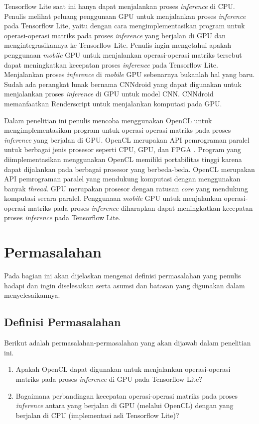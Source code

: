 Tensorflow Lite saat ini hanya dapat menjalankan proses \textit{inference} di CPU. Penulis melihat peluang penggunaan GPU untuk menjalankan proses \textit{inference} pada Tensorflow Lite, yaitu dengan cara mengimplementasikan program untuk operasi-operasi matriks pada proses \textit{inference} yang berjalan di GPU dan mengintegrasikannya ke Tensorflow Lite. Penulis ingin mengetahui apakah penggunaan \textit{mobile} GPU untuk menjalankan operasi-operasi matriks tersebut dapat meningkatkan kecepatan proses \textit{inference} pada Tensorflow Lite. Menjalankan proses \textit{inference} di \textit{mobile} GPU sebenarnya bukanlah hal yang baru. Sudah ada perangkat lunak bernama CNNdroid \cite{cnndroid} yang dapat digunakan untuk menjalankan proses \textit{inference} di GPU untuk model CNN. CNNdroid memanfaatkan Renderscript untuk menjalankan komputasi pada GPU.

Dalam penelitian ini penulis mencoba menggunakan OpenCL untuk mengimplementasikan program untuk operasi-operasi matriks pada proses \textit{inference} yang berjalan di GPU. OpenCL merupakan API pemrograman paralel untuk berbagai jenis prosesor seperti CPU, GPU, dan FPGA \cite{opencl}. Program yang diimplementasikan menggunakan OpenCL memiliki portabilitas tinggi karena dapat dijalankan pada berbagai prosesor yang berbeda-beda. OpenCL merupakan API pemrograman paralel yang mendukung komputasi dengan menggunakan banyak \textit{thread}. GPU merupakan prosesor dengan ratusan \textit{core} yang mendukung komputasi secara paralel. Penggunaan \textit{mobile} GPU untuk menjalankan operasi-operasi matriks pada proses \textit{inference} diharapkan dapat meningkatkan kecepatan proses \textit{inference} pada Tensorflow Lite.

\section{Permasalahan}
Pada bagian ini akan dijelaskan mengenai definisi permasalahan 
yang penulis hadapi dan ingin diselesaikan serta asumsi dan batasan yang digunakan dalam menyelesaikannya.
\subsection{Definisi Permasalahan}
Berikut adalah permasalahan-permasalahan yang akan dijawab dalam penelitian ini.
\begin{enumerate}
\item Apakah OpenCL dapat digunakan untuk menjalankan operasi-operasi matriks pada proses \textit{inference} di GPU pada Tensorflow Lite?
\item Bagaimana perbandingan kecepatan operasi-operasi matriks pada proses \textit{inference} antara yang berjalan di GPU (melalui OpenCL) dengan yang berjalan di CPU (implementasi asli Tensorflow Lite)?
\end{enumerate}

